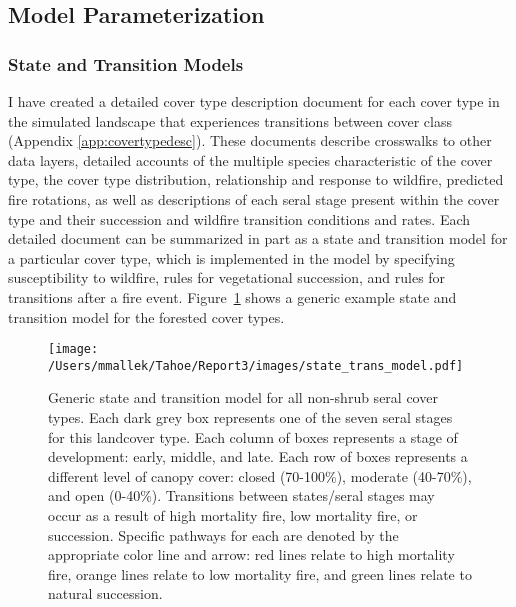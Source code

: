 \subsection{Model Parameterization}
\label{subsec:hrvmodelparam}

\subsubsection*{State and Transition Models}
I have created a detailed cover type description document for each cover type in the simulated landscape that experiences transitions between cover class (Appendix \ref{app:covertypedesc}). These documents describe crosswalks to other data layers, detailed accounts of the multiple species characteristic of the cover type, the cover type distribution, relationship and response to wildfire, predicted fire rotations, as well as descriptions of each seral stage present within the cover type and their succession and wildfire transition conditions and rates. Each detailed document can be summarized in part as a state and transition model for a particular cover type, which is implemented in the model by specifying susceptibility to wildfire, rules for vegetational succession, and rules for transitions after a fire event. Figure~\ref{transmodel} shows a generic example state and transition model for the forested cover types.

\begin{figure}[htbp]
\centering
\texttt{[image: /Users/mmallek/Tahoe/Report3/images/state\_trans\_model.pdf]}
\caption{Generic state and transition model for all non-shrub seral cover types. Each dark grey box represents one of the seven seral stages for this landcover type. Each column of boxes represents a stage of development: early, middle, and late. Each row of boxes represents a different level of canopy cover: closed (70-100\%), moderate (40-70\%), and open (0-40\%). Transitions between states/seral stages may occur as a result of high mortality fire, low mortality fire, or succession. Specific pathways for each are denoted by the appropriate color line and arrow: red lines relate to high mortality fire, orange lines relate to low mortality fire, and green lines relate to natural succession.} 
\label{transmodel}
\end{figure}


